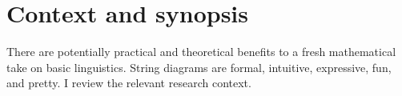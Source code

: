 \chapter{Context and synopsis}
There are potentially practical and theoretical benefits to a fresh mathematical take on basic linguistics. String diagrams are formal, intuitive, expressive, fun, and pretty. I review the relevant research context.
\clearpage
\newpage

\newpage
\label{sec:proctheory}
\newpage











